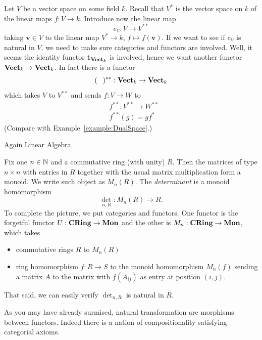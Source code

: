 \begin{example}
  Let \(V\) be a vector space on some field \(k\). Recall that
  \(V^\ast\) is the vector space on \(k\) of the linear maps
  \(f : V \to k\). Introduce now the linear map
  \[
    e_V : V \to V^{\ast\ast}
  \]
  taking \(\mathbf v \in V\) to the linear map \(V^\ast \to k\),
  \(f \mapsto f(\mathbf v)\). If we want to see if \(e_V\) is natural in
  \(V\), we need to make sure categories and functors are
  involved. Well, it seems the identity functor \(\mathtt 1_{\mathbf{Vect}_k}\) is
  involved, hence we want another functor \(\mathbf{Vect}_k \to \mathbf{Vect}_k\). In fact
  there is a functor
  \[
    (\phantom\square)^{\ast\ast} : \Vect_k \to \Vect_k
  \]
  which takes \(V\) to \(V^{\ast\ast}\) and sends \(f : V \to W\) to
  \begin{align*}
    & f^{\ast\ast} : V^{\ast\ast} \to W^{\ast\ast} \\
    & f^{\ast\ast} (g) = g f^\ast
  \end{align*}
  (Compare with Example~\ref{example:DualSpace}.)
\end{example}

Again Linear Algebra.

\begin{example}
  Fix one \(n \in \mathbb N\) and a commutative ring (with unity)
  \(R\). Then the matrices of type \(n \times n\) with entries in \(R\)
  together with the usual matrix multiplication form a monoid. We write
  such object as \(M_n(R)\). The {\em determinant} is a monoid
  homomorphism
  \[
    \det_{n, R} : M_n(R) \to R .
  \]
  To complete the picture, we put categories and functors. One functor
  is the forgetful functor \(U : \mathbf{CRing} \to \mathbf{Mon}\) and the other is
  \(M_n : \mathbf{CRing} \to \mathbf{Mon}\), which takes
  \begin{itemize}
  \item commutative rings \(R\) to \(M_n(R)\)
  \item ring homomorphism \(f : R \to S\) to the monoid homomorphism
    \(M_n(f)\) sending a matrix \(A\) to the matrix with \(f(A_{ij})\)
    as entry at position \((i, j)\).
  \end{itemize}
  That said, we can easily verify \(\det_{n, R}\) is natural in \(R\).
\end{example}

As you may have already surmised, natural transformation are morphisms
between functors. Indeed there is a nation of compositionality
satisfying categorial axioms.


